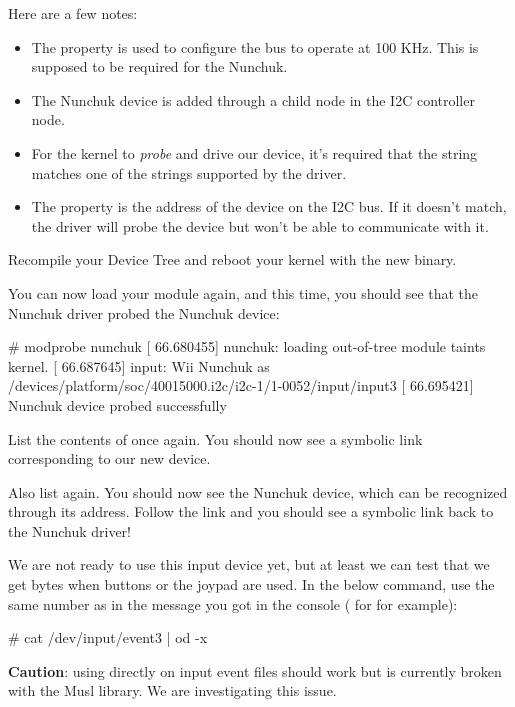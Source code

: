 {Here are a few notes:
\begin{itemize}
\item The  property is used to configure the bus
      to operate at 100 KHz. This is supposed to be required for the
      Nunchuk.
\item The Nunchuk device is added through a child node in the I2C
      controller node.
\item For the kernel to {\em probe} and drive our device, it's required
      that the  string matches one of the
       strings supported by the driver.
\item The  property is the address of the device on the
      I2C bus. If it doesn't match, the driver will probe the device
      but won't be able to communicate with it.
\end{itemize}

Recompile your Device Tree and reboot your kernel with the new binary.

You can now load your module again, and this time, you should see that
the Nunchuk driver probed the Nunchuk device:

\begin{bashinput}
# modprobe nunchuk
[   66.680455] nunchuk: loading out-of-tree module taints kernel.
[   66.687645] input: Wii Nunchuk as /devices/platform/soc/40015000.i2c/i2c-1/1-0052/input/input3
[   66.695421] Nunchuk device probed successfully
\end{bashinput}

List the contents of  once again. You
should now see a symbolic link corresponding to our new device.

Also list  again. You should now see the
Nunchuk device, which can be recognized through its  address.
Follow the link and you should see a symbolic link back to the Nunchuk
driver!

We are not ready to use this input device yet, but at least we can test
that we get bytes when buttons or the joypad are used. In the below
command, use the same number as in the message you got in the console
( for  for example):

\begin{bashinput}
# cat /dev/input/event3 | od -x
\end{bashinput}

{\bf Caution}: using  directly on input event files should
work but is currently broken with the Musl library. We are investigating
this issue.

}
